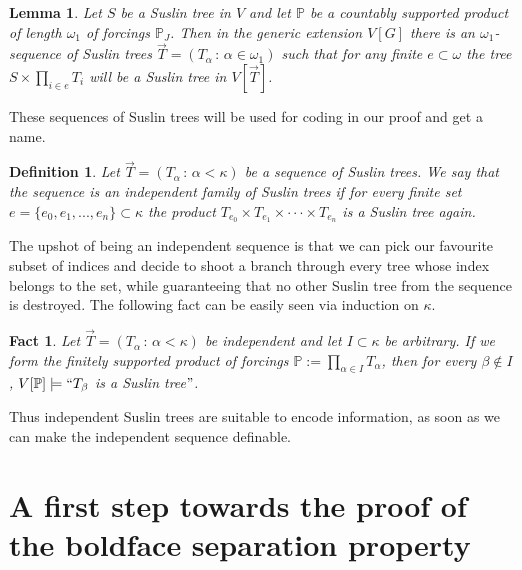 \documentclass[a4paper,11pt]{article}
\newtheorem{lemma}[theorem]{Lemma}
\newtheorem{definition}[theorem]{Definition}
\newtheorem{fact}[theorem]{Fact}
\newcommand{\forceP}{\mathbb{P}}
\begin{document}
\begin{lemma}\label{ManySuslinTrees}
 Let $S$ be a Suslin tree in $V$ and let $\forceP$ be a countably supported
 product of length $\omega_1$ of forcings $\forceP_J$. Then in the generic extension
 $V[G]$ there is an $\omega_1$-sequence of Suslin trees $\vec{T}=(T_{\alpha} \, : \, \alpha \in \omega_1)$ such
that for any finite $e \subset \omega$
the tree $S \times \prod_{i \in e} T_i$ will be a Suslin tree in $V[\vec{T}]$.
\end{lemma}

These sequences of Suslin trees will be used for coding in our proof and get a name.
\begin{definition}
 Let $\vec{T} = (T_{\alpha} \, : \, \alpha < \kappa)$ be a sequence of Suslin trees. We say that the sequence is an 
 independent family of Suslin trees if for every finite set $e= \{e_0, e_1,...,e_n\} \subset \kappa$ the product $T_{e_0} \times T_{e_1} \times \cdot \cdot \cdot \times T_{e_n}$ 
 is a Suslin tree again.
\end{definition}
The upshot of being an independent sequence is that we can pick our favourite subset of indices and decide to shoot a branch through every tree whose index belongs to the set, while guaranteeing that no other Suslin tree from the sequence is destroyed. The following fact can be easily seen via induction on $\kappa$.
\begin{fact}
Let $\vec{T} = (T_{\alpha} \, : \, \alpha < \kappa)$ be independent and let $I \subset \kappa$ be arbitrary.
If we form the finitely supported product of forcings $\forceP:=\prod_{\alpha \in I} T_{\alpha}$, then for every $\beta \notin I$,
$V[\forceP] \models ``T_{\beta}$ is a Suslin tree$"$.
\end{fact}
Thus independent Suslin trees are suitable to encode information, as soon as we can make the independent sequence definable. 
\section{A first step towards the proof of the boldface separation property}
\end{document}
